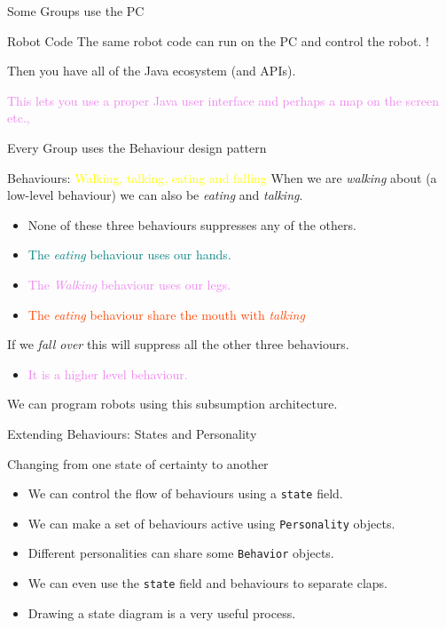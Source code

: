 \documentclass[color=pdftex,usenames,dvipsnames, aspectratio=169]{beamer}
\begin{document}
\begin{frame}{Some Groups use the PC}
\begin{block}{Robot Code}
\alert{The same robot code can run on the PC and control the robot. !}

\textcolor{OliveGreen}{Then you have all of the Java ecosystem (and APIs).}

\textcolor{violet}{This lets you use a proper Java user interface and perhaps a map on the screen etc.,}
\end{block}
\end{frame}

\begin{frame}{Every Group uses the Behaviour design pattern}
\begin{block}{Behaviours: \textcolor{yellow}{Walking, talking, eating and falling}}
\textcolor{OliveGreen}{When we are \emph{walking} about (a low-level behaviour) we can also be \emph{eating} and \emph{talking}.}

\begin{itemize}
\item  None of these three behaviours suppresses any of the others.

\item \textcolor{teal}{The \emph{eating} behaviour uses our hands.}

\item \textcolor{violet}{The \emph{Walking} behaviour uses our legs.}

\item \textcolor{OrangeRed}{The \emph{eating} behaviour share the mouth with \emph{talking} }
\end{itemize}

\textcolor{RedOrange}{If we \emph{fall over} this will \alert{suppress} all the other three behaviours.  }
\begin{itemize}
\item \textcolor{violet}{It is a higher level behaviour.}
\end{itemize}

We can program robots using this \alert{subsumption architecture}.
\end{block}
\end{frame}

\begin{frame}{Extending Behaviours: States and Personality}
\begin{block}{Changing from one state of certainty to another}
\begin{itemize}
\item We can control the flow of behaviours using a \texttt{state} field.
\item We can make a set of behaviours active using \texttt{Personality} objects. 
\item Different personalities can share some \texttt{Behavior} objects.
\item We can even use the \texttt{state} field and behaviours to separate claps.
\item \alert{Drawing a state diagram is a very useful process.}
\end{itemize}
\end{block}
\end{frame}
\end{document}
